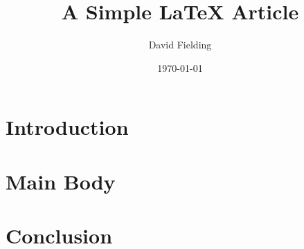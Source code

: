 \documentclass{article}
\title{A Simple LaTeX Article}
\author{David Fielding}
\date{\today}
\begin{document}
\maketitle

\section{Introduction}
\lipsum[1] %

\section{Main Body}
\lipsum[2-4] %



\section{Conclusion}
\lipsum[5] %
\end{document}
